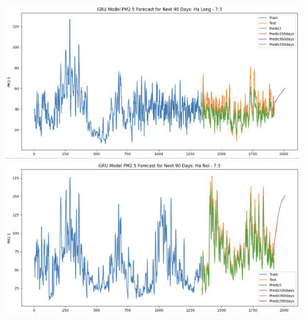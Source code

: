 
\begin{figure}[H]

    \centering
    \begin{minipage}{0.15\textwidth}
    \centering
    \end{minipage}
    \hfill

    \begin{minipage}{0.15\textwidth}
        \centering
        \includegraphics[width=1\textwidth, height=0.7\textwidth]{img/final/GRU/90D/GRU_7_3_HL.png}
        \end{minipage}
        \hfill
        \begin{minipage}{0.15\textwidth}
        \centering
        \includegraphics[width=1\textwidth, height=0.7\textwidth]{img/final/GRU/90D/GRU_7_3_HN.png}
        \end{minipage}

\end{figure}
